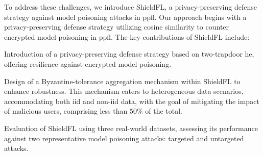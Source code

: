 To address these challenges, we introduce ShieldFL, a privacy-preserving defense strategy against model poisoning attacks in \ac{ppfl}.
Our approach begins with a privacy-preserving defense strategy utilizing cosine similarity to counter encrypted model poisoning in \ac{ppfl}.
The key contributions of ShieldFL include:
\begin{enumerate*}
    \item Introduction of a privacy-preserving defense strategy based on two-trapdoor \ac{he}, offering resilience against encrypted model poisoning.
    \item Design of a Byzantine-tolerance aggregation mechanism within ShieldFL to enhance robustness. This mechanism caters to heterogeneous data scenarios, accommodating both \ac{iid} and non-\ac{iid} data, with the goal of mitigating the impact of malicious users, comprising less than $50\%$ of the total.
    \item Evaluation of ShieldFL using three real-world datasets, assessing its performance against two representative model poisoning attacks: targeted and untargeted attacks. 
\end{enumerate*}